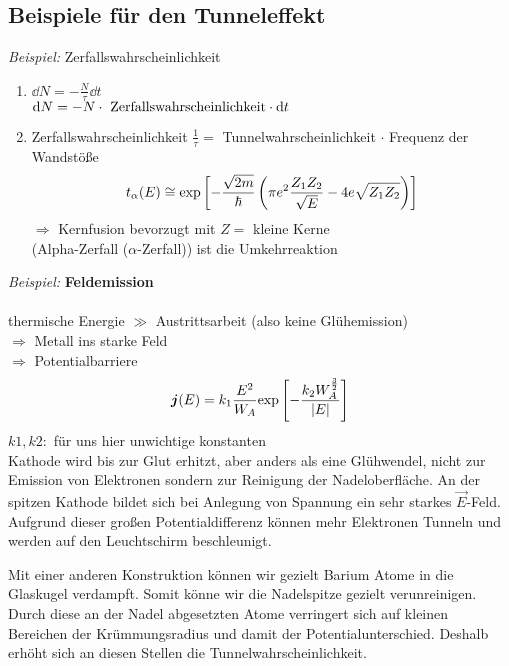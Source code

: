 \subsection{Beispiele für den Tunneleffekt}

\emph{Beispiel:} Zerfallswahrscheinlichkeit
\begin{enumerate}[1)]
	\item $ \dd N = - \frac{N}{\tau} \dd t $\\
	$ \textrm{d} N = - N \cdot \textrm{ Zerfallswahrscheinlichkeit} \cdot \textrm{d} t $
	\item Zerfallswahrscheinlichkeit $ \frac{1}{\tau} = $ Tunnelwahrscheinlichkeit $ \cdot $ Frequenz der Wandstöße\\
	\begin{equation*}
	t_{\alpha}(E) \cong \textrm{exp} \left[-\frac{\sqrt{2 m}}{\hbar} \left(\pi e^2 \frac{Z_1 Z_2}{\sqrt{E}} - 4 e \sqrt{Z_1 Z_2}\right)\right]
	\end{equation*}
	$ \Rightarrow $ Kernfusion bevorzugt mit $ Z = $ kleine Kerne\\
	(Alpha-Zerfall ($ \alpha $-Zerfall)) ist die Umkehrreaktion 
\end{enumerate}
\emph{Beispiel:} \textbf{Feldemission}\\[5pt]
\\
thermische Energie $ \gg $ Austrittsarbeit (also keine Glühemission)\\
$ \Rightarrow $ Metall ins starke Feld\\
$ \Rightarrow $ Potentialbarriere
\begin{equation*}
\bm{j}(E) = k_1 \frac{E^2}{W_A} \textrm{exp} \left[- \frac{k_2 W_{A}^{\frac{3}{2}}}{|E|}\right]
\end{equation*}
$ k1, k2 : $ für uns hier unwichtige konstanten\\[5pt]
\indent Kathode wird bis zur Glut erhitzt, aber anders als eine Glühwendel, nicht zur Emission von Elektronen sondern zur Reinigung der Nadeloberfläche. An der spitzen Kathode bildet sich bei Anlegung von Spannung ein sehr starkes $ \vec{E} $-Feld. Aufgrund dieser großen Potentialdifferenz können mehr Elektronen Tunneln und werden auf den Leuchtschirm beschleunigt.

Mit einer anderen Konstruktion können wir gezielt Barium Atome in die Glaskugel verdampft. Somit könne wir die Nadelspitze gezielt verunreinigen. Durch diese an der Nadel abgesetzten Atome verringert sich auf kleinen Bereichen der Krümmungsradius und damit der Potentialunterschied. Deshalb erhöht sich an diesen Stellen die Tunnelwahrscheinlichkeit.

